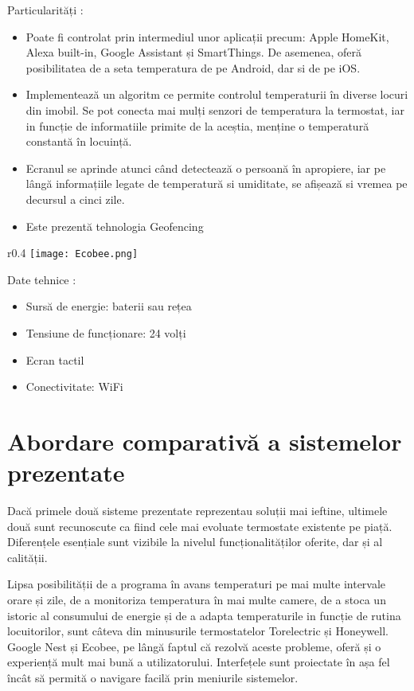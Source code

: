 	Particularități \cite{ecobee}:
	\begin{itemize}
	\setlength{\itemindent}{2em}
		\itemsep0em
		\item Poate fi controlat prin intermediul unor aplicații precum: Apple HomeKit, Alexa built-in, Google Assistant și SmartThings. De asemenea, oferă posibilitatea de a seta temperatura de pe Android, dar si de pe iOS.
		\item Implementează un algoritm ce permite controlul temperaturii în diverse locuri din imobil. Se pot conecta mai mulți senzori de temperatura la termostat, iar in funcție de informatiile primite de la aceștia, menține o temperatură constantă în locuință.
		\item Ecranul se aprinde atunci când detectează o persoană în apropiere, iar pe lângă informațiile legate de temperatură si umiditate, se afișează si vremea pe decursul a cinci zile.
		\item Este prezentă tehnologia Geofencing
	\end{itemize}

\vspace{2em}

\begin{wrapfigure}[5]{r}{0.4\textwidth}
\centering
\texttt{[image: Ecobee.png]}
\end{wrapfigure}
	Date tehnice \cite{ecobee}:
	\begin{itemize}
	\setlength{\itemindent}{2em}
		\itemsep0em
		\item Sursă de energie: baterii sau rețea
		\item Tensiune de funcționare: 24 volți
		\item Ecran tactil
		\item Conectivitate: WiFi
	\end{itemize}
\vspace{2em}

\section{Abordare comparativă a sistemelor prezentate}
	Dacă primele două sisteme prezentate reprezentau soluții mai ieftine, ultimele două sunt recunoscute ca fiind cele mai evoluate termostate existente pe piață. Diferențele esențiale sunt vizibile la nivelul funcționalităților oferite, dar și al calității.

	Lipsa posibilității de a programa în avans temperaturi pe mai multe intervale orare și zile, de a monitoriza temperatura în mai multe camere, de a stoca un istoric al consumului de energie și de a adapta temperaturile in funcție de rutina locuitorilor, sunt câteva din minusurile termostatelor Torelectric și Honeywell. Google Nest și Ecobee, pe lângă faptul că rezolvă aceste probleme, oferă și o experiență mult mai bună a utilizatorului. Interfețele sunt proiectate în așa fel încât să permită o navigare facilă prin meniurile sistemelor.  

